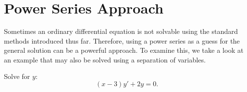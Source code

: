 \section{Power Series Approach}
Sometimes an ordinary differential equation is not solvable using the standard
methods introduced thus far. Therefore, using a power series as a guess for the
general solution can be a powerful approach. To examine this, we take a look
at an example that may also be solved using a separation of variables.
\begin{example}
    Solve for $y$: $$(x-3)y' + 2y = 0.$$
\end{example}
